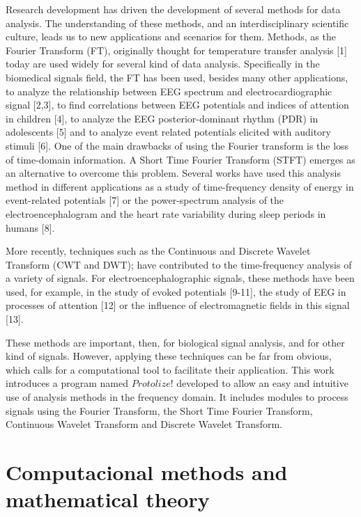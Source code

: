 \documentclass[12pt, a4paper]{article}
\begin{document}
Research development has driven the development of several methods for data analysis. The understanding of these methods, and an interdisciplinary scientific culture, leads us to new applications and scenarios for them. Methods, as the Fourier Transform (FT), originally thought for temperature transfer analysis [1] today are used widely for several kind of data analysis. Specifically in the biomedical signals field, the FT has been used, besides many other applications, to analyze the relationship between EEG spectrum and electrocardiographic signal [2,3], to find correlations between EEG potentials and indices of attention in children [4], to analyze the EEG posterior-dominant rhythm (PDR) in adolescents [5] and to analyze event related potentials elicited with auditory stimuli [6]. One of the main drawbacks of using the Fourier transform is the loss of time-domain information. A Short Time Fourier Transform (STFT) emerges as an alternative to overcome this problem. Several works have used this analysis method in different applications as a study of time-frequency density of energy in event-related potentials [7] or the power-spectrum analysis of the electroencephalogram and the heart rate variability during sleep periods in humans [8].

More recently, techniques such as the Continuous and Discrete Wavelet Transform (CWT and DWT); have contributed to the time-frequency analysis of a variety of signals. For electroencephalographic signals, these methods have been used, for example, in the study of evoked potentials [9-11], the study of EEG in processes of attention [12] or the influence of electromagnetic fields in this signal [13].

These methods are important, then, for biological signal analysis, and for other kind of signals. However, applying these techniques can be far from obvious, which calls for a computational tool to facilitate their application. This work introduces a program named $Protolize!$ developed to allow an easy and intuitive use of analysis methods in the frequency domain. It includes modules to process signals using the Fourier Transform, the Short Time Fourier Transform, Continuous Wavelet Transform and Discrete Wavelet Transform.

\section{Computacional methods and mathematical theory}
\end{document}
